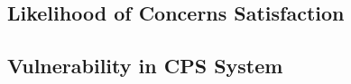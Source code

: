 \subsection{Likelihood of Concerns Satisfaction}
\begin{definition}
	\label{def:likelihood_concern_sat} 
	
\end{definition}

\subsection{Vulnerability in CPS System}
\begin{definition}
	\label{def:vulnerability} 
	
\end{definition}

\begin{proposition}
	\label{pro:most_vulnerability} 
	
\end{proposition}